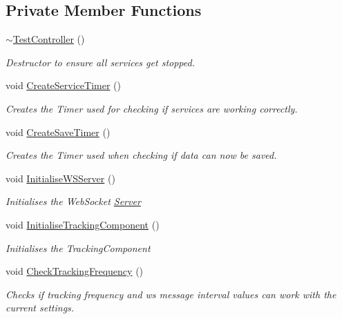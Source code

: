 \subsection*{Private Member Functions}
\begin{DoxyCompactItemize}
\item 
\hyperlink{class_web_analyzer_1_1_controller_1_1_test_controller_a9404350d73eb0d40751b1bdee5171b71}{$\sim$\+Test\+Controller} ()
\begin{DoxyCompactList}\small\item\em Destructor to ensure all services get stopped. \end{DoxyCompactList}\item 
void \hyperlink{class_web_analyzer_1_1_controller_1_1_test_controller_acdb2666f061e4f9d78ee7f24e9516495}{Create\+Service\+Timer} ()
\begin{DoxyCompactList}\small\item\em Creates the Timer used for checking if services are working correctly. \end{DoxyCompactList}\item 
void \hyperlink{class_web_analyzer_1_1_controller_1_1_test_controller_a448797a07babe883ab8d8e646272a6eb}{Create\+Save\+Timer} ()
\begin{DoxyCompactList}\small\item\em Creates the Timer used when checking if data can now be saved. \end{DoxyCompactList}\item 
void \hyperlink{class_web_analyzer_1_1_controller_1_1_test_controller_ade3e5f82b576f428d7c9faf22d831f1d}{Initialise\+W\+S\+Server} ()
\begin{DoxyCompactList}\small\item\em Initialises the Web\+Socket \hyperlink{namespace_web_analyzer_1_1_server}{Server} \end{DoxyCompactList}\item 
void \hyperlink{class_web_analyzer_1_1_controller_1_1_test_controller_a6c1ad0ad7207cb09294e21a4b1cdaf6b}{Initialise\+Tracking\+Component} ()
\begin{DoxyCompactList}\small\item\em Initialises the Tracking\+Component \end{DoxyCompactList}\item 
void \hyperlink{class_web_analyzer_1_1_controller_1_1_test_controller_ae6675c76b8af44f6c0ac8c9e9d2ee628}{Check\+Tracking\+Frequency} ()
\begin{DoxyCompactList}\small\item\em Checks if tracking frequency and ws message interval values can work with the current settings. \end{DoxyCompactList}\item 

\end{DoxyCompactItemize}
